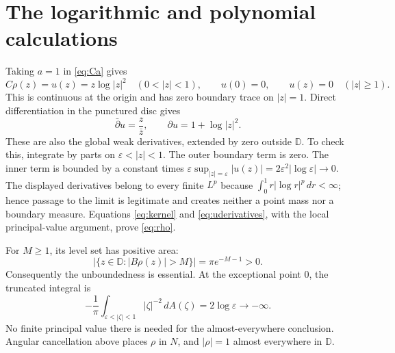 \documentclass[10pt]{article}
\newcommand{\D}{\mathbb D}
\newcommand{\dd}{\,dA}
\newcommand{\dbar}{\bar\partial}
\begin{document}
\section{The logarithmic and polynomial calculations}
Taking $a=1$ in \eqref{eq:Ca} gives
\[
 C\rho(z)=u(z)=z\log|z|^2\quad(0<|z|<1),
 \qquad u(0)=0,\qquad u(z)=0\quad(|z|\ge1).
\]
This is continuous at the origin and has zero boundary trace on
$|z|=1$. Direct differentiation in the punctured disc gives
\begin{equation}\label{eq:uderivatives}
 \dbar u=\frac z{\bar z},\qquad \partial u=1+\log|z|^2.
\end{equation}
These are also the global weak derivatives, extended by zero outside
$\D$. To check this, integrate by parts on
$\varepsilon<|z|<1$. The outer boundary term is zero. The inner term
is bounded by a constant times
$\varepsilon\sup_{|z|=\varepsilon}|u(z)|
 =2\varepsilon^2|\log\varepsilon|\to0$.
The displayed derivatives belong to every finite $L^p$ because
$\int_0^1 r|\log r|^p\,dr<\infty$; hence passage to the limit is
legitimate and creates neither a point mass nor a boundary measure.
Equations \eqref{eq:kernel} and \eqref{eq:uderivatives}, with the local
principal-value argument, prove \eqref{eq:rho}.

For $M\ge1$, its level set has positive area:
\begin{equation}\label{eq:level}
 \bigl|\{z\in\D:|B\rho(z)|>M\}\bigr|=\pi e^{-M-1}>0.
\end{equation}
Consequently the unboundedness is essential. At the exceptional point
$0$, the truncated integral is
\[
 -\frac1\pi\int_{\varepsilon<|\zeta|<1}|\zeta|^{-2}\dd(\zeta)
 =2\log\varepsilon\longrightarrow-\infty.
\]
No finite principal value there is needed for the almost-everywhere
conclusion. Angular cancellation above
places $\rho$ in $N$, and $|\rho|=1$ almost everywhere in $\D$.
\end{document}
